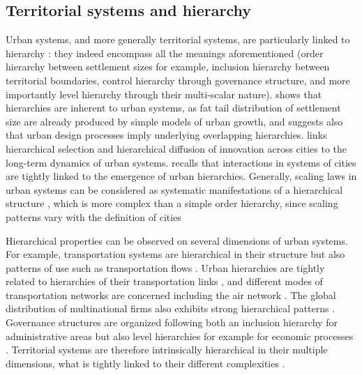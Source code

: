 \documentclass[11pt]{article}
\begin{document}
\subsection{Territorial systems and hierarchy}


Urban systems, and more generally territorial systems, are particularly linked to hierarchy \citep{pumain2006hierarchy}: they indeed encompass all the meanings aforementioned (order hierarchy between settlement sizes for example, inclusion hierarchy between territorial boundaries, control hierarchy through governance structure, and more importantly level hierarchy through their multi-scalar nature). \cite{batty2006hierarchy} shows that hierarchies are inherent to urban systems, as fat tail distribution of settlement size are already produced by simple models of urban growth, and suggests also that urban design processes imply underlying overlapping hierarchies. \cite{pumain2006alternative} links hierarchical selection and hierarchical diffusion of innovation across cities to the long-term dynamics of urban systems. \cite{pumain:halshs-02303136} recalls that interactions in systems of cities are tightly linked to the emergence of urban hierarchies. Generally, scaling laws in urban systems can be considered as systematic manifestations of a hierarchical structure \citep{pumain2004scaling}, which is more complex than a simple order hierarchy, since scaling patterns vary with the definition of cities \citep{cottineau2017diverse}

Hierarchical properties can be observed on several dimensions of urban systems. For example, transportation systems are hierarchical in their structure \citep{yerra2005emergence} but also patterns of use such as transportation flows \citep{jiang2009street}. Urban hierarchies are tightly related to hierarchies of their transportation links \citep{bigotte2010integrated}, and different modes of transportation networks are concerned including the air network \citep{dang2012hierarchy}. The global distribution of multinational firms also exhibits strong hierarchical patterns \citep{godfrey1999ranking}. Governance structures are organized following both an inclusion hierarchy for administrative areas \citep{li2015administrative} but also level hierarchies for example for economic processes \citep{liao2017opening}. Territorial systems are therefore intrinsically hierarchical in their multiple dimensions, what is tightly linked to their different complexities \citep{2019arXiv190109869R}. 
\end{document}
